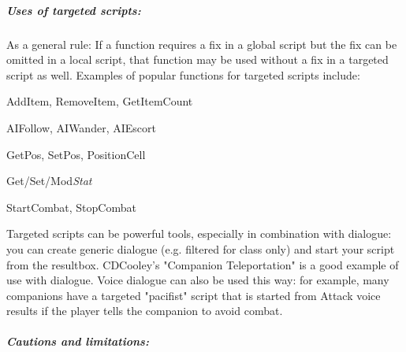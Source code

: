 \documentclass[
]{article}
\begin{document}
\hypertarget{uses-of-targeted-scripts}{%
\subparagraph{Uses of targeted
scripts:}\label{uses-of-targeted-scripts}}

As a general rule: If a function requires a fix in a global script but
the fix can be omitted in a local script, that function may be used
without a fix in a targeted script as well. Examples of popular
functions for targeted scripts include:

AddItem, RemoveItem, GetItemCount

AIFollow, AIWander, AIEscort

GetPos, SetPos, PositionCell

Get/Set/Mod\emph{Stat}

StartCombat, StopCombat

Targeted scripts can be powerful tools, especially in combination with
dialogue: you can create generic dialogue (e.g. filtered for class only)
and start your script from the resultbox. CDCooley's "Companion
Teleportation" is a good example of use with dialogue. Voice dialogue
can also be used this way: for example, many companions have a targeted
"pacifist" script that is started from Attack voice results if the
player tells the companion to avoid combat.

\hypertarget{cautions-and-limitations}{%
\subparagraph{Cautions and
limitations:}\label{cautions-and-limitations}}
\end{document}

